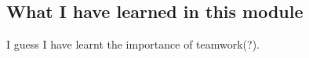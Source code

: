 

\subsection{What I have learned in this module}
I guess I have learnt the importance of teamwork(?).

